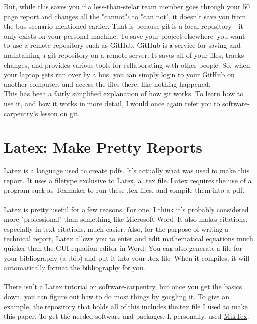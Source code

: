 \documentclass[letterpaper]{article}
\begin{document}
But, while this saves you if a less-than-stelar team member goes through your 50 page report and changes all the "cannot"s to "can not", it doesn't save you from the bus-scenario mentioned earlier.  That is because git is a local repository - it only exists on your personal machine.  To save your project elsewhere, you want to use a remote repository such as GitHub.  GitHub is a service for saving and maintaining a git repository on a remote server.  It saves all of your files, tracks changes, and provides various tools for collaborating with other people.  So, when your laptop gets run over by a bus, you can simply login to your GitHub on another computer, and access the files there, like nothing happened.\\

This has been a fairly simplified explanation of how git works.  To learn how to use it, and how it works in more detail, I would once again refer you to software-carpentry's lesson on \href{http://swcarpentry.github.io/git-novice/}{git}.

\section{Latex: Make Pretty Reports}

Latex is a language used to create pdfs.  It's actually what was used to make this report.  It uses a filetype exclusive to Latex, a .tex file.  Latex requires the use of a program such as Texmaker to run these .tex files, and compile them into a pdf.\\
\\
Latex is pretty useful for a few reasons.  For one, I think it's probably considered more "professional" than something like Microsoft Word.  It also makes citations, especially in-text citations, much easier.  Also, for the purpose of writing a technical report, Latex allows you to enter and edit mathematical equations much quicker than the GUI equation editor in Word.  You can also generate a file for your bibliography (a .bib) and put it into your .tex file.  When it compiles, it will automatically format the bibliography for you.
\\
\\
There isn't a Latex tutorial on software-carpentry, but once you get the basics down, you can figure out how to do most things by googling it.  To give an example, the repository that holds all of this includes the.tex file I used to make this paper.  To get the needed software and packages, I, personally, used \href{https://miktex.org/about}{MikTex}.\\
\end{document}
